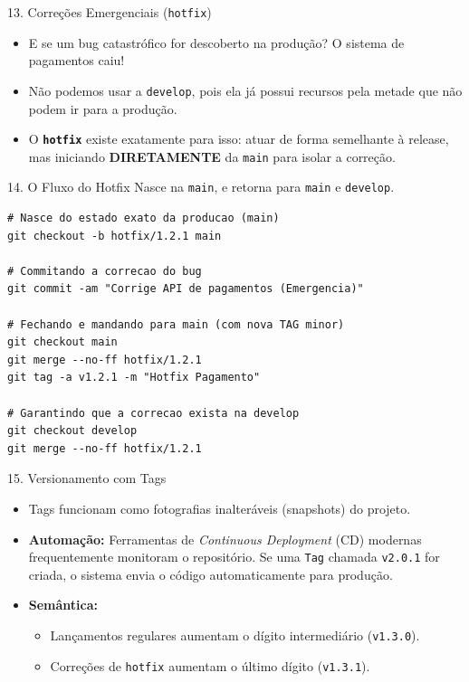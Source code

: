 \documentclass[aspectratio=169]{beamer}
\begin{document}
\begin{frame}{13. Correções Emergenciais (\texttt{hotfix})}
    \begin{itemize}
        \item E se um bug catastrófico for descoberto na produção? O sistema de pagamentos caiu!
        \item Não podemos usar a \texttt{develop}, pois ela já possui recursos pela metade que não podem ir para a produção.
        \item O \textbf{\texttt{hotfix}} existe exatamente para isso: atuar de forma semelhante à release, mas iniciando \textbf{DIRETAMENTE} da \texttt{main} para isolar a correção.
    \end{itemize}
\end{frame}

\begin{frame}[fragile]{14. O Fluxo do Hotfix}
    Nasce na \texttt{main}, e retorna para \texttt{main} e \texttt{develop}.
    \vspace{0.2cm}
\begin{lstlisting}
# Nasce do estado exato da producao (main)
git checkout -b hotfix/1.2.1 main

# Commitando a correcao do bug
git commit -am "Corrige API de pagamentos (Emergencia)"

# Fechando e mandando para main (com nova TAG minor)
git checkout main
git merge --no-ff hotfix/1.2.1
git tag -a v1.2.1 -m "Hotfix Pagamento"

# Garantindo que a correcao exista na develop
git checkout develop
git merge --no-ff hotfix/1.2.1
\end{lstlisting}
\end{frame}

\begin{frame}{15. Versionamento com Tags}
    \begin{itemize}
        \item Tags funcionam como fotografias inalteráveis (snapshots) do projeto.
        \item \textbf{Automação:} Ferramentas de \textit{Continuous Deployment} (CD) modernas frequentemente monitoram o repositório. Se uma \texttt{Tag} chamada \texttt{v2.0.1} for criada, o sistema envia o código automaticamente para produção.
        \item \textbf{Semântica:} 
        \begin{itemize}
            \item Lançamentos regulares aumentam o dígito intermediário (\texttt{v1.3.0}).
            \item Correções de \texttt{hotfix} aumentam o último dígito (\texttt{v1.3.1}).
        \end{itemize}
    \end{itemize}
\end{frame}
\end{document}
